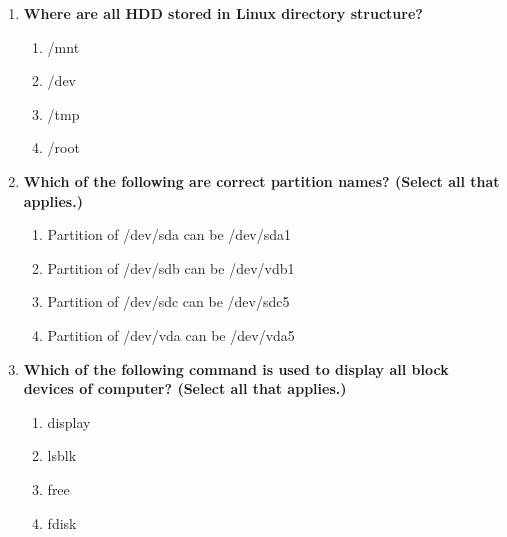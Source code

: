 \begin{flushleft}
\begin{enumerate}
		\item \textbf{Where are all HDD stored in Linux directory structure?}
		\begin{enumerate}[label=(\alph*)]
			\item /mnt
			\item /dev   %
			\item /tmp
			\item /root
		\end{enumerate}
		\bigskip
		\bigskip
		
		
		\item \textbf{Which of the following are correct partition names? (Select all that applies.)}
		\begin{enumerate}[label=(\alph*)]
			\item Partition of /dev/sda can be /dev/sda1     %
			\item Partition of /dev/sdb can be /dev/vdb1
			\item Partition of /dev/sdc can be /dev/sdc5    %
			\item Partition of /dev/vda can be /dev/vda5     %
		\end{enumerate}
		\bigskip
		\bigskip
		
		
		\bigskip
		\bigskip
		\item \textbf{Which of the following command is used to display all block devices of computer? (Select all that applies.)}
		\begin{enumerate}[label=(\alph*)]
			\item display
			\item lsblk  %
			\item free     %
			\item fdisk  %
		\end{enumerate}
		
		\bigskip
		\bigskip	
		
	\end{enumerate}
	
	
\end{flushleft}

\newpage

